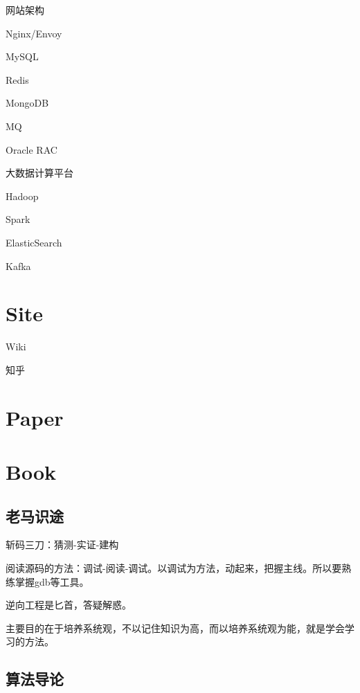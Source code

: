 网站架构
\begin{enumbox}
\item Nginx/Envoy
\item MySQL
\item Redis
\item MongoDB
\item MQ
\item Oracle RAC
\end{enumbox}

大数据计算平台
\begin{enumbox}
\item Hadoop
\item Spark
\item ElasticSearch
\item Kafka
\end{enumbox}

\section{Site}

\begin{enumbox}
\item Wiki
\item 知乎
\end{enumbox}

\section{Paper}

\section{Book}

\subsection{老马识途}

斩码三刀：猜测-实证-建构

阅读源码的方法：调试-阅读-调试。以调试为方法，动起来，把握主线。所以要熟练掌握gdb等工具。

逆向工程是匕首，答疑解惑。

主要目的在于培养系统观，不以记住知识为高，而以培养系统观为能，就是学会学习的方法。

\subsection{算法导论}

